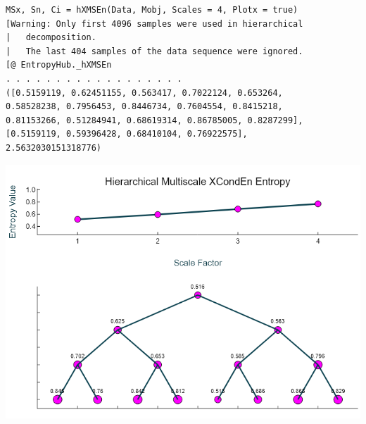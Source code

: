 \documentclass[12pt, a4paper, titlepage, openany]{book}
\begin{document}
\begin{verbatim}
MSx, Sn, Ci = hXMSEn(Data, Mobj, Scales = 4, Plotx = true)
[Warning: Only first 4096 samples were used in hierarchical 
|	decomposition.
|   The last 404 samples of the data sequence were ignored.
[@ EntropyHub._hXMSEn 
. . . . . . . . . . . . . . . . . .
([0.5159119, 0.62451155, 0.563417, 0.7022124, 0.653264, 
0.58528238, 0.7956453, 0.8446734, 0.7604554, 0.8415218, 
0.81153266, 0.51284941, 0.68619314, 0.86785005, 0.8287299], 
[0.5159119, 0.59396428, 0.68410104, 0.76922575],
2.5632030151318776)
\end{verbatim}
\includegraphics[scale=.5]{hXMSEnjl.png}\newline \newline



\newpage
\end{document}
